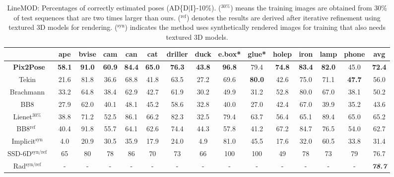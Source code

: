 \documentclass[10pt,twocolumn,letterpaper]{article}
\begin{document}
\setlength{\tabcolsep}{4.5pt}
\begin{table*}[ht]
\begin{center}
\begin{tabular}{c | c c c c c c c c c c c c c|c}
 \space &ape & bvise & cam&can & cat & driller & duck & e.box* & glue* & holep & iron & lamp & phone & avg\\
 \hline
 \textbf{Pix2Pose} & \textbf{58.1} & \textbf{91.0} & \textbf{60.9} & \textbf{84.4} & \textbf{65.0} & \textbf{76.3} & \textbf{43.8} & \textbf{96.8} & 79.4 & \textbf{74.8} & \textbf{83.4} & \textbf{82.0} & 45.0 & \textbf{72.4}\\
 
 
Tekin~\cite{Tekin_2018_CVPR} & 21.6 & 81.8 & 36.6 & 68.8 & 41.8 & 63.5 & 27.2 & 69.6 &\textbf{80.0} & 42.6 &75.0 & 71.1 & \textbf{47.7} & 56.0\\
Brachmann~\cite{cnn_pose:brachmann2016uncertainty_only_rgb} & 33.2 & 64.8 & 38.4 & 62.9& 42.7& 61.9&30.2 & 49.9 & 31.2 & 52.8 & 80.0 & 67.0 & 38.1 & 50.2 \\
BB8~\cite{rad2017bb8} & 27.9 & 62.0 & 40.1 & 48.1 &45.2 & 58.6 & 32.8 & 40.0 & 27.0 & 42.4 & 67.0 & 39.9 & 35.2 & 43.6 \\
\hline
Lienet$^{30\%}$~\cite{Do2018LieNetRM} & 38.8 & 71.2 & 52.5 & 86.1 &66.2 & 82.3 & 32.5 & 79.4 & 63.7 & 56.4 & 65.1 & 89.4 & 65.0 & 65.2 \\
BB8$^{\textrm{ref}}$ ~\cite{rad2017bb8} & 40.4 & 91.8 & 55.7 & 64.1 &62.6 & 74.4 & 44.3 & 57.8 & 41.2 & 67.2 & 84.7 & 76.5 & 54.0  & 62.7\\
Implicit$^{\textrm{syn}}$~\cite{Sundermeyer_2018_ECCV_implicit} & 4.0 & 20.9 & 30.5 & 35.9 &17.9 & 24.0 & 4.9 & 81.0 & 45.5 & 17.6 & 32.0 & 60.5 & 33.8 & 31.4\\
SSD-6D$^\textrm{syn/ref}$~\cite{kehl2017ssd} & 65 & 80 & 78 & 86 & 70 & 73 &66 & 100 & 100 & 49 & 78 & 73 & 79 & 76.7\\
Rad$^\textrm{syn/ref}$~\cite{Rad_2018_CVPR} & - & - & - & - & - & - &- & - & - & - & - & - & - & \textit{\textbf{78.7}}\\


\end{tabular}
\end{center}
\caption{LineMOD: Percentages of correctly estimated poses (AD\{D$\vert$I\}-10\%). ($^{30\%}$) means the training images are obtained from 30\% of test sequences that are two times larger than ours. ($^{\textrm{ref}}$) denotes the results are derived after iterative refinement using textured 3D models for rendering. ($^\textrm{syn}$) indicates the method uses synthetically rendered images for training that also needs textured 3D models.}
\label{table_linemod}
\end{table*}
\end{document}
